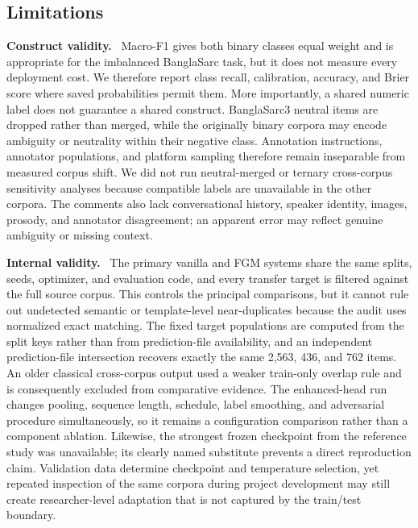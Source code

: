 \documentclass{ieeeaccess}
\newcommand{\runin}[1]{\smallskip\noindent\textbf{#1}\ }
\begin{document}
\subsection{Limitations}
\label{sec:discussion-limitations}

\runin{Construct validity.} Macro-F1 gives both binary classes equal weight and is appropriate for the imbalanced BanglaSarc task, but it does not measure every deployment cost. We therefore report class recall, calibration, accuracy, and Brier score where saved probabilities permit them. More importantly, a shared numeric label does not guarantee a shared construct. BanglaSarc3 neutral items are dropped rather than merged, while the originally binary corpora may encode ambiguity or neutrality within their negative class. Annotation instructions, annotator populations, and platform sampling therefore remain inseparable from measured corpus shift. We did not run neutral-merged or ternary cross-corpus sensitivity analyses because compatible labels are unavailable in the other corpora. The comments also lack conversational history, speaker identity, images, prosody, and annotator disagreement; an apparent error may reflect genuine ambiguity or missing context.

\runin{Internal validity.} The primary vanilla and FGM systems share the same splits, seeds, optimizer, and evaluation code, and every transfer target is filtered against the full source corpus. This controls the principal comparisons, but it cannot rule out undetected semantic or template-level near-duplicates because the audit uses normalized exact matching. The fixed target populations are computed from the split keys rather than from prediction-file availability, and an independent prediction-file intersection recovers exactly the same 2{,}563, 436, and 762 items. An older classical cross-corpus output used a weaker train-only overlap rule and is consequently excluded from comparative evidence. The enhanced-head run changes pooling, sequence length, schedule, label smoothing, and adversarial procedure simultaneously, so it remains a configuration comparison rather than a component ablation. Likewise, the strongest frozen checkpoint from the reference study was unavailable; its clearly named substitute prevents a direct reproduction claim. Validation data determine checkpoint and temperature selection, yet repeated inspection of the same corpora during project development may still create researcher-level adaptation that is not captured by the train/test boundary.
\end{document}
